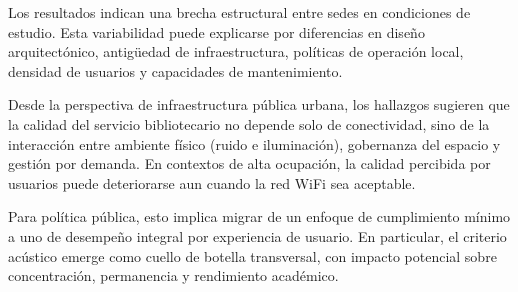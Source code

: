 Los resultados indican una brecha estructural entre sedes en condiciones de estudio. Esta variabilidad puede explicarse por diferencias en diseño arquitectónico, antigüedad de infraestructura, políticas de operación local, densidad de usuarios y capacidades de mantenimiento.

Desde la perspectiva de infraestructura pública urbana, los hallazgos sugieren que la calidad del servicio bibliotecario no depende solo de conectividad, sino de la interacción entre ambiente físico (ruido e iluminación), gobernanza del espacio y gestión por demanda. En contextos de alta ocupación, la calidad percibida por usuarios puede deteriorarse aun cuando la red WiFi sea aceptable.

Para política pública, esto implica migrar de un enfoque de cumplimiento mínimo a uno de desempeño integral por experiencia de usuario. En particular, el criterio acústico emerge como cuello de botella transversal, con impacto potencial sobre concentración, permanencia y rendimiento académico.
